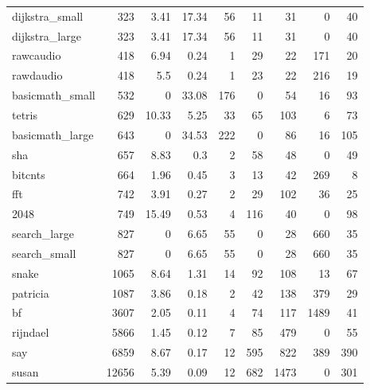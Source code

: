\begin{tabular}{lrrrrrrrr}
 dijkstra\_small  &            323 &     3.41 &  17.34 &   56 &     11 &           31 &     0 &    40 \\
 dijkstra\_large  &            323 &     3.41 &  17.34 &   56 &     11 &           31 &     0 &    40 \\
 rawcaudio       &            418 &     6.94 &   0.24 &    1 &     29 &           22 &   171 &    20 \\
 rawdaudio       &            418 &     5.5  &   0.24 &    1 &     23 &           22 &   216 &    19 \\
 basicmath\_small &            532 &     0    &  33.08 &  176 &      0 &           54 &    16 &    93 \\
 tetris          &            629 &    10.33 &   5.25 &   33 &     65 &          103 &     6 &    73 \\
 basicmath\_large &            643 &     0    &  34.53 &  222 &      0 &           86 &    16 &   105 \\
 sha             &            657 &     8.83 &   0.3  &    2 &     58 &           48 &     0 &    49 \\
 bitcnts         &            664 &     1.96 &   0.45 &    3 &     13 &           42 &   269 &     8 \\
 fft             &            742 &     3.91 &   0.27 &    2 &     29 &          102 &    36 &    25 \\
 2048            &            749 &    15.49 &   0.53 &    4 &    116 &           40 &     0 &    98 \\
 search\_large    &            827 &     0    &   6.65 &   55 &      0 &           28 &   660 &    35 \\
 search\_small    &            827 &     0    &   6.65 &   55 &      0 &           28 &   660 &    35 \\
 snake           &           1065 &     8.64 &   1.31 &   14 &     92 &          108 &    13 &    67 \\
 patricia        &           1087 &     3.86 &   0.18 &    2 &     42 &          138 &   379 &    29 \\
 bf              &           3607 &     2.05 &   0.11 &    4 &     74 &          117 &  1489 &    41 \\
 rijndael        &           5866 &     1.45 &   0.12 &    7 &     85 &          479 &     0 &    55 \\
 say             &           6859 &     8.67 &   0.17 &   12 &    595 &          822 &   389 &   390 \\
 susan           &          12656 &     5.39 &   0.09 &   12 &    682 &         1473 &     0 &   301 \\

\end{tabular}
